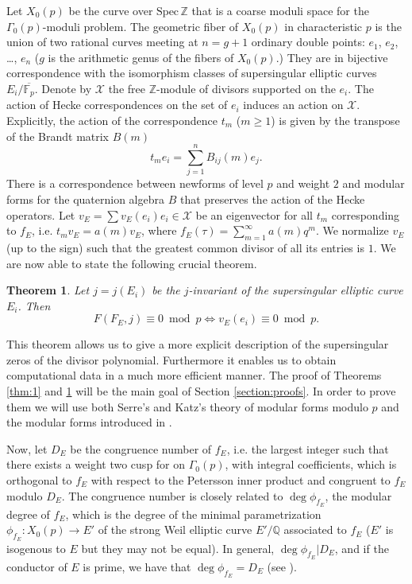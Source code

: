 \documentclass[13pt]{amsart}
\newtheorem{theorem}{Theorem}
\theoremstyle{remark}
\numberwithin{theorem}{section} \numberwithin{equation}{section}
\begin{document}
Let $X_0(p)$ be the curve over $\mathrm{Spec}\, {\mathbb{Z}}$ that is a coarse moduli space for the $\Gamma_0(p)$-moduli problem. The geometric fiber of $X_0(p)$ in characteristic $p$ is the union of two rational curves meeting at $n=g+1$ ordinary double points: $e_1$, $e_2$, \ldots, $e_{n}$ ($g$ is the arithmetic genus of the fibers of $X_0(p)$.) They are in bijective correspondence with the isomorphism classes of supersingular elliptic curves $E_i/\overline{\mathbb{F}_p}$. Denote by $\mathcal{X}$ the free ${\mathbb{Z}}$-module of divisors supported on the $e_i$. The action of Hecke correspondences on the set of $e_i$ induces an action on ${\mathcal{X}}$. Explicitly, the action of the correspondence $t_m$ ($m\ge 1$) is given by the transpose  of the Brandt matrix $B(m)$
\[
t_m e_i = \sum_{j=1}^n B_{ij}(m)e_j.
\]
There is a correspondence between newforms of level $p$ and weight $2$ and modular forms for the quaternion algebra $B$ that preserves the action
of the Hecke operators.
Let $v_E=\sum v_E(e_i)e_i\in {\mathcal{X}}$  be an eigenvector for all $t_m$ corresponding to $f_E$, i.e. $t_m v_E= a(m) v_E$, where $f_E(\tau)=\sum_{m=1}^\infty a(m)q^m$. We normalize $v_E$ (up to the sign) such that the greatest common divisor of all its entries is $1$. We are now able to state the following
crucial theorem.
\begin{theorem} \label{thm:zeros}
Let $j=j(E_i)$ be the $j$-invariant of the supersingular elliptic curve $E_i$. Then 
$$F(F_E,j) \equiv 0 \bmod{p} \iff v_E(e_i) \equiv 0 \bmod{p}.$$ 
\end{theorem}

This theorem allows us to give a more explicit description of the supersingular zeros of the divisor polynomial. Furthermore it enables us to obtain computational data in a much more efficient manner.
The proof of Theorems \ref{thm:1} and \ref{thm:zeros} will be the main goal of Section \ref{section:proofs}. In order to prove them we will use
 both Serre's and Katz's theory of modular forms modulo $p$ and the modular forms introduced in \cite{Serre2}.

Now, let $D_E$ be the congruence number of $f_E$, i.e. the largest integer such 
that there exists a weight two cusp for on $\Gamma_0(p)$, with integral 
coefficients, which is orthogonal to $f_E$ with respect to the Petersson inner 
product and congruent to $f_E$ modulo $D_E$.
The congruence number is closely related to $\deg \phi_{f_E}$, the modular 
degree of $f_E$, which is the degree of the minimal parametrization 
$\phi_{f_E}:X_0(p)\rightarrow E'$ of the strong Weil elliptic curve $E'/{\mathbb{Q}}$ 
associated to $f_E$ ($E'$ is isogenous to $E$ but they may not be equal). In 
general, $\deg \phi_{f_E}|D_E$, and if the 
conductor of $E$ is prime, we have that $\deg \phi_{f_E}=D_E$ (see \cite{ARS}). 
\end{document}

